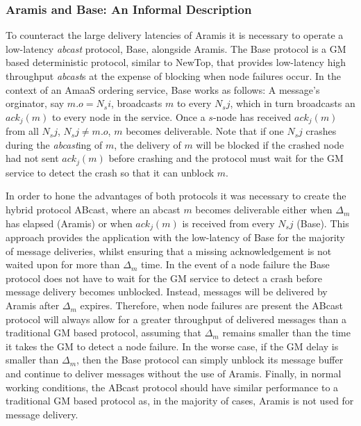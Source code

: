     \subsubsection*{\textsf{Aramis} and \textsf{Base}: An Informal Description}    
    To counteract the large delivery latencies of \textsf{Aramis} it is necessary to operate a low-latency \emph{abcast} protocol, \textsf{Base}, alongside \textsf{Aramis}.  The \textsf{Base} protocol is a GM based deterministic protocol, similar to NewTop\citep{Ezhilchelvan:1995:NFG:876885.880005}, that provides low-latency high throughput \emph{abcast}s at the expense of blocking when node failures occur.  In the context of an \textsf{AmaaS} ordering service, \textsf{Base} works as follows: A message's orginator, say $m.o = N_si$, broadcasts $m$ to every $N_sj$, which in turn broadcasts an $ack_j(m)$ to every node in the service.  Once a $s$-node has received $ack_j(m)$ from all $N_sj$, $N_sj \neq m.o$, $m$ becomes deliverable.  Note that if one $N_sj$ crashes during the \emph{abcast}ing of $m$, the delivery of $m$ will be blocked if the crashed node had not sent $ack_j(m)$ before crashing and the protocol must wait for the GM service to detect the crash so that it can unblock $m$.   
    
    In order to hone the advantages of both protocols it was necessary to create the hybrid protocol \textsf{ABcast}, where an \textsf{abcast} $m$ becomes deliverable either when $\Delta_m$ has elapsed (\textsf{Aramis}) or when $ack_j(m)$ is received from every $N_sj$ (\textsf{Base}).  This approach provides the application with the low-latency of \textsf{Base} for the majority of message deliveries, whilst ensuring that a missing acknowledgement is not waited upon for more than $\Delta_m$ time.  In the event of a node failure the \textsf{Base} protocol does not have to wait for the GM service to detect a crash before message delivery becomes unblocked.  Instead, messages will be delivered by \textsf{Aramis} after $\Delta_m$ expires.  Therefore, when node failures are present the \textsf{ABcast} protocol will always allow for a greater throughput of delivered messages than a traditional GM based protocol, assuming that $\Delta_m$ remains smaller than the time it takes the GM to detect a node failure.  In the worse case, if the GM delay is smaller than $\Delta_m$, then the \textsf{Base} protocol can simply unblock its message buffer and continue to deliver messages without the use of \textsf{Aramis}.  Finally, in normal working conditions, the \textsf{ABcast} protocol should have similar performance to a traditional GM based protocol as, in the majority of cases, \textsf{Aramis} is not used for message delivery.  

